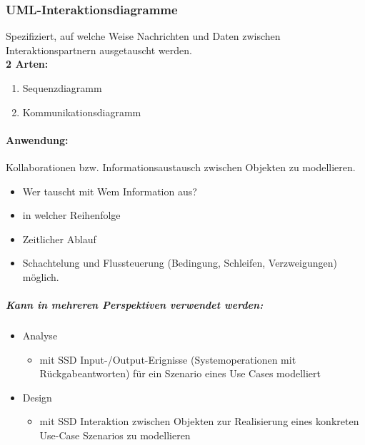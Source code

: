 \documentclass[../ZF_SWEN1.tex]{subfiles}
\begin{document}
\subsubsection{UML-Interaktionsdiagramme}

Spezifiziert, auf welche Weise Nachrichten und Daten zwischen Interaktionspartnern ausgetauscht werden. \\

\textcolor {WildStrawberry}{\textbf{2 Arten:}}
\begin{enumerate}
	\item Sequenzdiagramm
	\item Kommunikationsdiagramm
\end{enumerate}

\paragraph{\textcolor {WildStrawberry}{\textbf{Anwendung:}}} Kollaborationen bzw. Informationsaustausch zwischen Objekten zu modellieren.

\begin{itemize}
	\item Wer tauscht mit Wem Information aus?
	\item in welcher Reihenfolge
	\item Zeitlicher Ablauf
	\item Schachtelung und Flussteuerung (Bedingung, Schleifen, Verzweigungen) möglich.
\end{itemize}

\subparagraph{\textcolor {WildStrawberry}{\textbf{Kann in mehreren Perspektiven verwendet werden:}}}
\begin{itemize}
	\item \textcolor {Periwinkle}{Analyse}
	\begin{itemize}
		\item mit SSD Input-/Output-Erignisse (Systemoperationen mit Rückgabeantworten) für ein Szenario eines Use Cases modelliert
	\end{itemize}
	\item \textcolor {Periwinkle}{Design}
	\begin{itemize}
		\item mit SSD Interaktion zwischen Objekten zur Realisierung eines konkreten Use-Case Szenarios zu modellieren
	\end{itemize}
\end{itemize}
\end{document}
